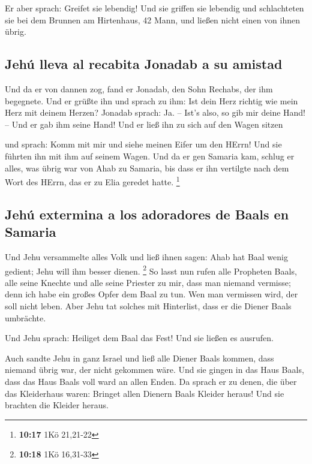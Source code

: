  Er aber sprach: Greifet sie lebendig! Und sie griffen
sie lebendig und schlachteten sie bei dem Brunnen am Hirtenhaus, 42
Mann, und ließen nicht einen von ihnen übrig.

\hypertarget{jehuxfa-lleva-al-recabita-jonadab-a-su-amistad}{%
\subsection{Jehú lleva al recabita Jonadab a su
amistad}\label{jehuxfa-lleva-al-recabita-jonadab-a-su-amistad}}

 Und da er von dannen zog, fand er Jonadab, den Sohn
Rechabs, der ihm begegnete. Und er grüßte ihn und sprach zu ihm: Ist
dein Herz richtig wie mein Herz mit deinem Herzen? Jonadab sprach: Ja.
-- Ist's also, so gib mir deine Hand! -- Und er gab ihm seine Hand! Und
er ließ ihn zu sich auf den Wagen sitzen

 und sprach: Komm mit mir und siehe meinen Eifer um den
HErrn! Und sie führten ihn mit ihm auf seinem Wagen.  Und
da er gen Samaria kam, schlug er alles, was übrig war von Ahab zu
Samaria, bis dass er ihn vertilgte nach dem Wort des HErrn, das er zu
Elia geredet hatte. \footnote{\textbf{10:17} 1Kö 21,21-22}

\hypertarget{jehuxfa-extermina-a-los-adoradores-de-baals-en-samaria}{%
\subsection{Jehú extermina a los adoradores de Baals en
Samaria}\label{jehuxfa-extermina-a-los-adoradores-de-baals-en-samaria}}

 Und Jehu versammelte alles Volk und ließ ihnen sagen:
Ahab hat Baal wenig gedient; Jehu will ihm besser dienen. \footnote{\textbf{10:18}
  1Kö 16,31-33}  So lasst nun rufen alle Propheten Baals,
alle seine Knechte und alle seine Priester zu mir, dass man niemand
vermisse; denn ich habe ein großes Opfer dem Baal zu tun. Wen man
vermissen wird, der soll nicht leben. Aber Jehu tat solches mit
Hinterlist, dass er die Diener Baals umbrächte.

 Und Jehu sprach: Heiliget dem Baal das Fest! Und sie
ließen es ausrufen.

 Auch sandte Jehu in ganz Israel und ließ alle Diener
Baals kommen, dass niemand übrig war, der nicht gekommen wäre. Und sie
gingen in das Haus Baals, dass das Haus Baals voll ward an allen Enden.
 Da sprach er zu denen, die über das Kleiderhaus waren:
Bringet allen Dienern Baals Kleider heraus! Und sie brachten die Kleider
heraus.

